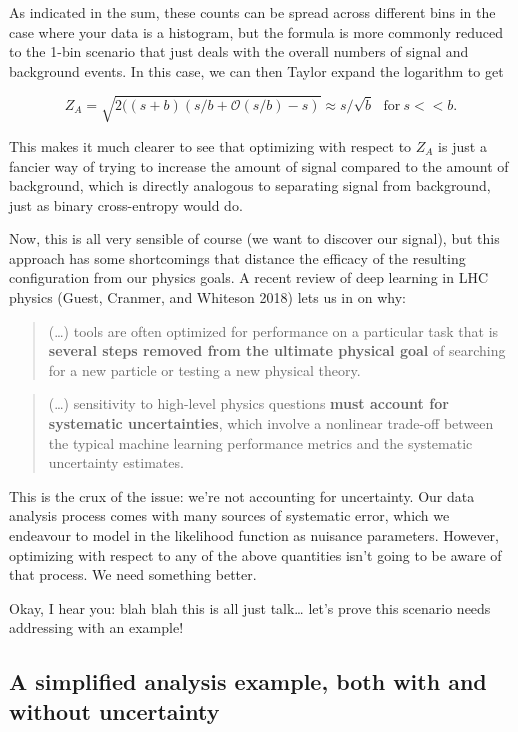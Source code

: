 \documentclass[
  11pt,
  numbers=noendperiod]{book}
\begin{document}
As indicated in the sum, these counts can be spread across different
bins in the case where your data is a histogram, but the formula is more
commonly reduced to the 1-bin scenario that just deals with the overall
numbers of signal and background events. In this case, we can then
Taylor expand the logarithm to get

\[Z_A = \sqrt{2((s+b)(s/b + \mathcal{O}(s/b) - s)} \approx s/\sqrt{b}~~~\mathrm{for}~s<<b.\]

This makes it much clearer to see that optimizing with respect to
\(Z_A\) is just a fancier way of trying to increase the amount of signal
compared to the amount of background, which is directly analogous to
separating signal from background, just as binary cross-entropy would
do.

Now, this is all very sensible of course (we want to discover our
signal), but this approach has some shortcomings that distance the
efficacy of the resulting configuration from our physics goals. A recent
review of deep learning in LHC physics (Guest, Cranmer, and Whiteson
2018) lets us in on why:

\begin{quote}
(\ldots) tools are often optimized for performance on a particular task
that is \textbf{several steps removed from the ultimate physical goal}
of searching for a new particle or testing a new physical theory.
\end{quote}

\begin{quote}
(\ldots) sensitivity to high-level physics questions \textbf{must
account for systematic uncertainties}, which involve a nonlinear
trade-off between the typical machine learning performance metrics and
the systematic uncertainty estimates.
\end{quote}

This is the crux of the issue: we're not accounting for uncertainty. Our
data analysis process comes with many sources of systematic error, which
we endeavour to model in the likelihood function as nuisance parameters.
However, optimizing with respect to any of the above quantities isn't
going to be aware of that process. We need something better.

Okay, I hear you: blah blah this is all just talk\ldots{} let's prove
this scenario needs addressing with an example!

\hypertarget{sec-simple-anal}{%
\subsection{A simplified analysis example, both with and without
uncertainty}\label{sec-simple-anal}}
\end{document}
